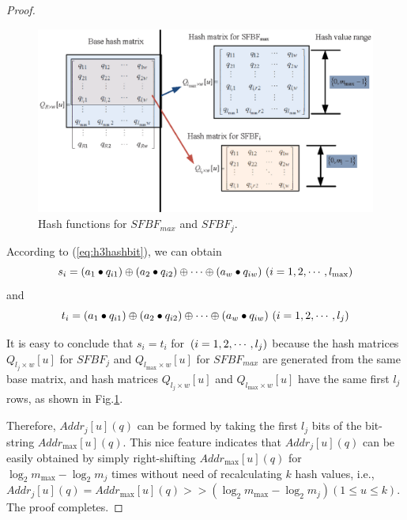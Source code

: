 \documentclass[10pt,journal,letterpaper]{IEEEtran}
\begin{document}
\begin{proof}
\begin{figure}[!h]
\centering
\includegraphics[width=3.6 in]{fig/Different_hash_functions}
\caption{Hash functions for $SFBF_{max}$ and $SFBF_j$.}
\label{fig:Different hash function for different SFBF vectors}
\end{figure}
According to (\ref{eq:h3hashbit}), we can obtain
\begin{equation}
\footnotesize
{s_i} = \left( {{a_1} \bullet {q_{i1}}} \right) \oplus \left( {{a_2} \bullet {q_{i2}}} \right) \oplus  \cdots  \oplus \left( {{a_w} \bullet {q_{iw}}} \right){\rm{   }}\left( {i = 1,2, \cdots ,{l_{\max }}} \right)
\end{equation}
and
\begin{equation}
\footnotesize
{t_i} = \left( {{a_1} \bullet {q_{i1}}} \right) \oplus \left( {{a_2} \bullet {q_{i2}}} \right) \oplus  \cdots  \oplus \left( {{a_w} \bullet {q_{iw}}} \right){\rm{   }}\left( {i = 1,2, \cdots ,{l_j}} \right)
\end{equation}

It is easy to conclude that ${s_i} = {t_i}$ for ${\rm{ }}\left( {i = 1,2, \cdots ,{l_j}} \right)$ because the hash matrices ${Q_{l_j \times w}}\left[ u \right]$ for $SFBF_j$ and ${Q_{{l_{\max }} \times w}}[u]$ for $SFBF_{max}$ are generated from the same base matrix, and hash matrices ${Q_{l_j \times w}}\left[ u \right]$ and ${Q_{{l_{\max }} \times w}}[u]$ have the same first $l_j$ rows, as shown in Fig.\ref{fig:Different hash function for different SFBF vectors}.

Therefore, $Add{r_j}\left[ u \right](q)$ can be formed by taking the first $l_j$ bits of the bit-string $Add{r_{\max }}\left[ u \right](q)$. This nice feature indicates that $Add{r_j}\left[ u \right](q)$ can be easily obtained
by simply right-shifting $Add{r_{\max }}\left[ u \right](q)$ for ${\log _2}{m_{\max }} - {\log _2}{m_j}$ times without need of recalculating $k$ hash values, i.e.,$Add{r_j}\left[ u \right](q) = Add{r_{\max }}\left[ u \right] (q)>  >( {\log _2}{m_{\max }} - {\log _2}{m_j})\left( {1 \le u \le k} \right)$. The proof completes.
\end{proof}
\end{document}
